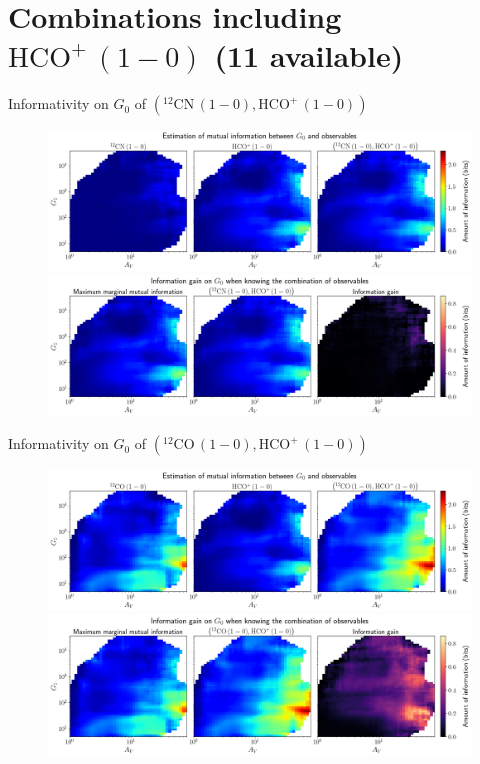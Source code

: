 \documentclass{beamer}
\begin{document}
\section{Combinations including $\mathrm{HCO^+\,(1-0)}$ (11 available)}

\begin{frame}{Informativity on $G_0$ of $\left(\mathrm{^{12}CN\,(1-0)},\mathrm{HCO^+\,(1-0)}\right)$}
    \begin{figure}
        \centering
        \includegraphics[width=0.95\linewidth]{../mi/g0__12cn10_hcop10_mi.png}
        \vfill
        \includegraphics[width=0.95\linewidth]{../mi/g0__12cn10_hcop10_mi_gain.png}
    \end{figure}
\end{frame}

\begin{frame}{Informativity on $G_0$ of $\left(\mathrm{^{12}CO\,(1-0)},\mathrm{HCO^+\,(1-0)}\right)$}
    \begin{figure}
        \centering
        \includegraphics[width=0.95\linewidth]{../mi/g0__12co10_hcop10_mi.png}
        \vfill
        \includegraphics[width=0.95\linewidth]{../mi/g0__12co10_hcop10_mi_gain.png}
    \end{figure}
\end{frame}
\end{document}
